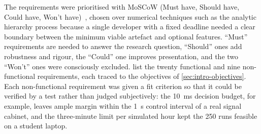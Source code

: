 The requirements were prioritised with MoSCoW (Must have, Should have, Could have, Won't have)~\cite{hudaib2018requirements}, chosen over numerical techniques such as the analytic hierarchy process because a single developer with a fixed deadline needed a clear boundary between the minimum viable artefact and optional features. ``Must'' requirements are needed to answer the research question, ``Should'' ones add robustness and rigour, the ``Could'' one improves presentation, and the two ``Won't'' ones were consciously excluded.  list the twenty functional and nine non-functional requirements, each traced to the objectives of \cref{sec:intro-objectives}. Each non-functional requirement was given a fit criterion so that it could be verified by a test rather than judged subjectively: the 10~ms decision budget, for example, leaves ample margin within the 1~s control interval of a real signal cabinet, and the three-minute limit per simulated hour kept the 250 runs feasible on a student laptop.

